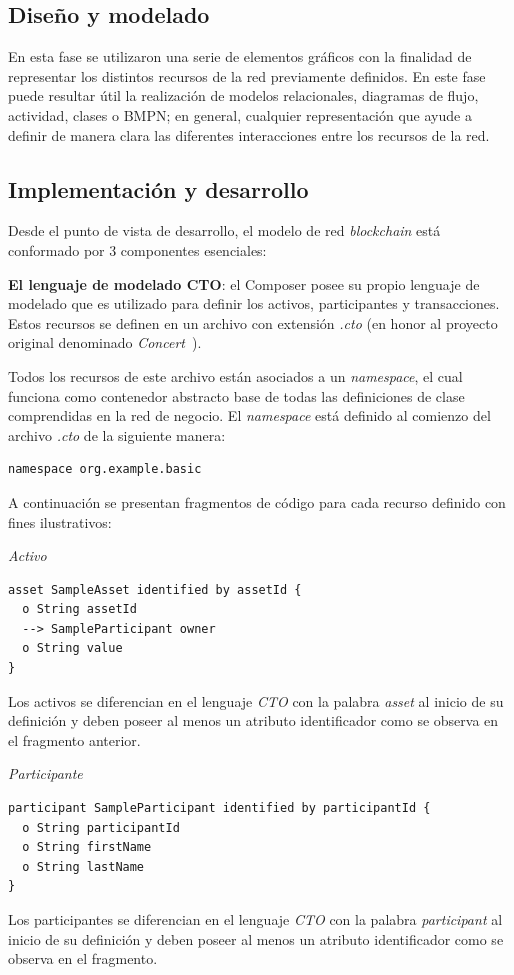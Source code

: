 \subsection{Diseño y modelado} 
En esta fase se utilizaron una serie de elementos gráficos con la finalidad de representar los distintos recursos de la red previamente definidos. En este fase puede resultar útil la realización de modelos relacionales, diagramas de flujo, actividad, clases o BMPN; en general, cualquier representación que ayude a definir de manera clara las diferentes  interacciones entre los recursos de la red.


\subsection{Implementación y desarrollo}
Desde el punto de vista de desarrollo, el modelo de red \textit{blockchain} está conformado por 3 componentes esenciales:

\textbf{El lenguaje de modelado CTO}: el Composer posee su propio lenguaje de modelado que es utilizado para definir los activos, participantes y transacciones. Estos recursos se definen en un archivo con extensión \textit{.cto} (en honor al  proyecto original denominado \textit{Concert}~\cite{ibmDevWorks}).

Todos los recursos de este archivo están asociados a un \textit{namespace}, el cual funciona como contenedor abstracto base de todas las definiciones de clase comprendidas en la red de negocio. El \textit{namespace} está definido al comienzo del archivo \textit{.cto} de la siguiente manera:

\begin{lstlisting}
namespace org.example.basic
\end{lstlisting}

A continuación se presentan fragmentos de código para cada recurso definido con fines ilustrativos:

\textit{Activo}
\begin{lstlisting}
asset SampleAsset identified by assetId {
  o String assetId
  --> SampleParticipant owner
  o String value
}
\end{lstlisting}
Los activos se diferencian en el lenguaje \textit{CTO} con la palabra \textit{asset} al inicio de su definición y deben poseer al menos un atributo identificador como se observa en el fragmento anterior.

\textit{Participante}
\begin{lstlisting}
participant SampleParticipant identified by participantId {
  o String participantId
  o String firstName
  o String lastName
}
\end{lstlisting}
Los participantes se diferencian en el lenguaje \textit{CTO} con la palabra \textit{participant} al inicio de su definición y deben poseer al menos un atributo identificador como se observa en el fragmento.

